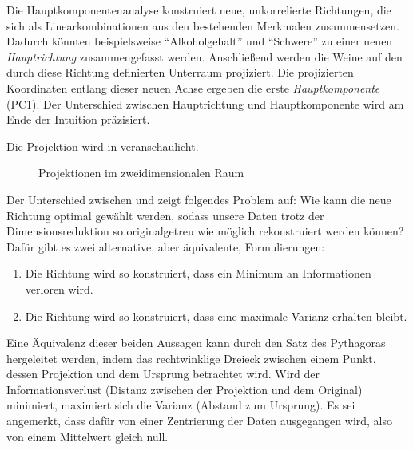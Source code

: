 Die Hauptkomponentenanalyse konstruiert neue, unkorrelierte Richtungen, die sich als Linearkombinationen aus den bestehenden Merkmalen zusammensetzen.
Dadurch könnten beispielsweise \enquote{Alkoholgehalt} und \enquote{Schwere} zu einer neuen \emph{Hauptrichtung} zusammengefasst werden.
Anschließend werden die Weine auf den durch diese Richtung definierten Unterraum projiziert.
Die projizierten Koordinaten entlang dieser neuen Achse ergeben die erste \emph{Hauptkomponente} (PC1).
Der Unterschied zwischen Hauptrichtung und Hauptkomponente wird am Ende der Intuition präzisiert.

Die Projektion wird in  veranschaulicht.
\begin{figure}[bt]
    \centering
    \begin{subfigure}{\textwidth}
        \centering
        \caption{}\label{fig:pca2d1}
        
        \hspace{20pt}
        
    \end{subfigure}
    \begin{subfigure}{\textwidth}
        \centering
        \caption{}\label{fig:pca2d2}
        
        \hspace{20pt}
        
    \end{subfigure}
    \caption{Projektionen im zweidimensionalen Raum}\label{fig:pca2d}
\end{figure}
Der Unterschied zwischen  und  zeigt folgendes Problem auf:
Wie kann die neue Richtung optimal gewählt werden, sodass unsere Daten trotz der Dimensionsreduktion so originalgetreu wie möglich rekonstruiert werden können?
Dafür gibt es zwei alternative, aber äquivalente, Formulierungen:
\vspace{-2pt}
\begin{enumerate}
    \item Die Richtung wird so konstruiert, dass ein Minimum an Informationen verloren wird.
    \item Die Richtung wird so konstruiert, dass eine maximale Varianz erhalten bleibt.
\end{enumerate}
Eine Äquivalenz dieser beiden Aussagen kann durch den Satz des Pythagoras hergeleitet werden, indem das rechtwinklige Dreieck zwischen einem Punkt, dessen Projektion und dem Ursprung betrachtet wird. 
Wird der Informationsverlust (Distanz zwischen der Projektion und dem Original) minimiert, maximiert sich die Varianz (Abstand zum Ursprung).
Es sei angemerkt, dass dafür von einer Zentrierung der Daten ausgegangen wird, also von einem Mittelwert gleich null.

